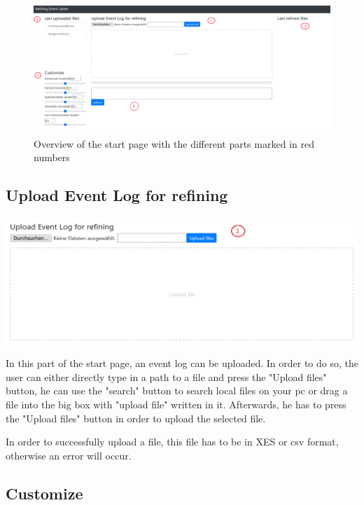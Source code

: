 \documentclass[notitlepage]{article}
\begin{document}
\begin{flushleft}
\begin{figure}[h]
\includegraphics[scale=0.33]{startpage.png}
\caption{Overview of the start page with the different parts marked in red numbers}
\end{figure}

\subsection{Upload Event Log for refining}

\includegraphics[scale=0.5]{uploadEventLog.png}

In this part of the start page, an event log can be uploaded. In order to do so, the user can either directly type in a path to a file and press the "Upload files" button, he can use the "search" button to search local files on your pc or drag a file into the big box with "upload file" written in it. Afterwards, he has to press the "Upload files" button in order to upload the selected file. 

In order to successfully upload a file, this file has to be in XES or csv format, otherwise an error will occur. 



\subsection{Customize}


\end{flushleft}
\end{document}
